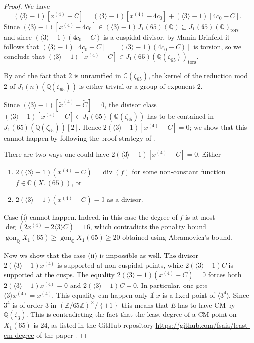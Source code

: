 \documentclass[11pt,reqno]{amsart}
\DeclareMathOperator{\ddiv}{div}
\DeclareMathOperator{\gon}{gon}
\theoremstyle{definition}
\numberwithin{equation}{section}
\newcommand{\Q}{\mathbb{Q}}
\newcommand{\C}{\mathbb{C}}
\newcommand{\tor}{\mathrm{tors}}
\def\torz#1{\mathbb Z /#1 \mathbb Z}
\newcommand{\diamondop}[1]{\langle #1 \rangle} %
\newcommand{\set}[1]{\left\lbrace #1 \right\rbrace}
\begin{document}
\begin{proof}
    We have
    $$(\diamondop{3}-1)[x^{(4)}-C]=(\diamondop{3}-1)[x^{(4)}-4c_0]+(\diamondop{3}-1)[4c_0 -C].$$
    Since $(\diamondop{3}-1)[x^{(4)}-4c_0]\in (\diamondop{3}-1)J_1(65)(\Q) \subseteq J_1(65)(\Q)_{\tor}$ and since $(\diamondop{3}-1)(4c_0 -C)$ is a cuspidal divisor, by Manin-Drinfeld it follows that $(\diamondop{3}-1)[4c_0 -C]=[(\diamondop{3}-1)(4c_0 -C)]$ is torsion, so we conclude that $(\diamondop{3}-1)[x^{(4)}-C]\in J_1(65)(\Q(\zeta_{65}))_{\tor}$.

    By \cite[Prop 2.4]{Parent00} and the fact that $2$ is unramified in $\Q(\zeta_{65})$, the kernel of the reduction mod $2$ of $J_1(n)(\Q(\zeta_{65}))$ is either trivial or a group of exponent $2$.

     Since $(\diamondop{3}-1)[\tilde{x}^{(4)} - \widetilde{C}]=0$, the divisor class $(\diamondop{3}-1)[x^{(4)}-C]\in J_1(65)(\Q(\zeta_{65}))$ has to be contained in $J_1(65)(\Q(\zeta_{65}))[2]$. Hence $2(\diamondop{3}-1)[x^{(4)}-C]=0$; we show that this cannot happen by following the proof strategy of .
     
     There are two ways one could have $2(\diamondop{3}-1)[x^{(4)}-C]=0$. Either 
     \begin{enumerate}
         \item[(i)]  $2(\diamondop{3}-1)(x^{(4)}-C)=\ddiv(f)$ for some non-constant function $f \in \C(X_1(65))$, or
         \item[(ii)] $2(\diamondop{3}-1)(x^{(4)}-C)=0$ as a divisor.
    \end{enumerate}
    
    Case (i) cannot happen. Indeed, in this case the degree of $f$ is at most $\deg(2x^{(4)}+2\diamondop{3}C) = 16$, which contradicts the gonality bound $\gon_\Q X_1(65)\geq \gon_\C X_1(65)\geq 20$ obtained using Abramovich's bound. 
    
    Now we show that the case (ii) is impossible as well. The divisor $2(\diamondop{3}-1)x^{(4)}$ is supported at non-cuspidal points, while $2(\diamondop{3}-1)C$ is supported at the cusps. The equality $2(\diamondop{3}-1)(x^{(4)}-C)=0$ forces both $2(\diamondop{3}-1)x^{(4)}=0$ and $2(\diamondop{3}-1)C=0$. In particular, one gets $\diamondop{3}x^{(4)}=x^{(4)}$. This equality can happen only if $x$ is a fixed point of $\diamondop{3^4}$. Since $3^4$ is of order $3$ in $(\torz{65})^\times/\set{\pm 1}$ this means that $E$ has to have CM by $\Q(\zeta_3)$. This is contradicting the fact that the least degree of a CM point on $X_1(65)$ is 24, as listed in the GitHub repository \url{https://github.com/fsaia/least-cm-degree} of the paper \cite{CGPS22}.
\end{proof}
\end{document}
